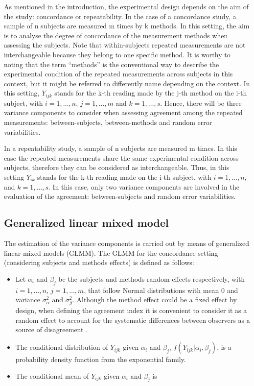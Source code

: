 As mentioned in the introduction, the experimental design depends on the
aim of the study: concordance or repeatability. In the case of a
concordance study, a sample of n subjects are measured m times by k
methods. In this setting, the aim is to analyse the degree of
concordance of the measurement methods when assessing the subjects. Note
that within-subjects repeated measurements are not interchangeable
because they belong to one specific method. It is worthy to noting that
the term ``methods'' is the conventional way to describe the
experimental condition of the repeated measurements across subjects in
this context, but it might be referred to differently name depending on
the context. In this setting, \(Y_{ijk}\) stands for the k-th reading
made by the j-th method on the i-th subject, with \(i=1,\ldots,n\),
\(j=1,\ldots,m\) and \(k=1,\ldots,s\). Hence, there will be three
variance components to consider when assessing agreement among the
repeated measurements: between-subjects, between-methods and random
error variabilities.

In a repeatability study, a sample of n subjects are measured m times.
In this case the repeated measurements share the same experimental
condition across subjects, therefore they can be considered as
interchangeable. Thus, in this setting \(Y_{ik}\) stands for the k-th
reading made on the i-th subject, with \(i=1,\ldots,n\), and
\(k=1,\ldots,s\). In this case, only two variance components are
involved in the evaluation of the agreement: between-subjects and random
error variabilities.

\hypertarget{generalized-linear-mixed-model}{%
\subsection{Generalized linear mixed
model}\label{generalized-linear-mixed-model}}

The estimation of the variance components is carried out by means of
generalized linear mixed models (GLMM). The GLMM for the concordance
setting (considering subjects and methods effects) is defined as
follows:

\begin{itemize}
\item
  Let \(\alpha_i\) and \(\beta_j\) be the subjects and methods random
  effects respectively, with \(i=1,\ldots,n\), \(j=1,\ldots,m\), that
  follow Normal distributions with mean 0 and variance
  \(\sigma_{\alpha}^2\) and \(\sigma_{\beta}^2\). Although the method
  effect could be a fixed effect by design, when defining the agreement
  index it is convenient to consider it as a random effect to account
  for the systematic differences between observers as a source of
  disagreement \citep{fleiss1986, carrasco2003}.
\item
  The conditional distribution of \(Y_{ijk}\) given \(\alpha_i\) and
  \(\beta_j\), \(f\left(Y_{ijk}|\alpha_i,\beta_j\right)\), is a
  probability density function from the exponential family.
\item
  The conditional mean of \(Y_{ijk}\) given \(\alpha_i\) and \(\beta_j\)
  is
\end{itemize}

